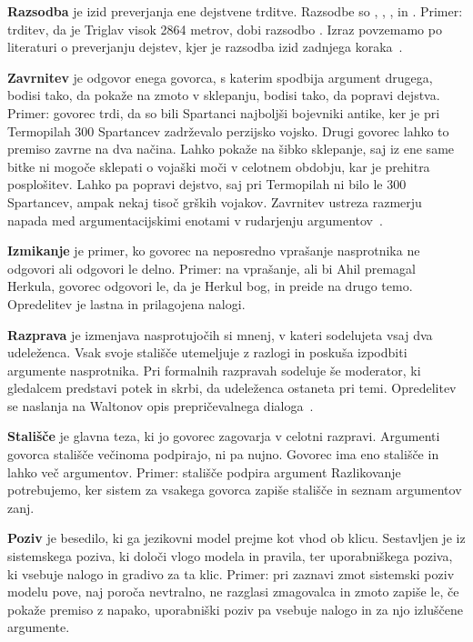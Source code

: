 \documentclass[a4paper, 12pt]{book}
\begin{document}
\textbf{Razsodba} je izid preverjanja ene dejstvene trditve. Razsodbe so , , ,  in . Primer: trditev, da je Triglav visok 2864 metrov, dobi razsodbo . Izraz povzemamo po literaturi o preverjanju dejstev, kjer je razsodba izid zadnjega koraka~\cite{guo2022survey}. 

\textbf{Zavrnitev} je odgovor enega govorca, s katerim spodbija argument drugega, bodisi tako, da pokaže na zmoto v sklepanju, bodisi tako, da popravi dejstva. Primer: govorec trdi, da so bili Spartanci najboljši bojevniki antike, ker je pri Termopilah 300 Spartancev zadrževalo perzijsko vojsko. Drugi govorec lahko to premiso zavrne na dva načina. Lahko pokaže na šibko sklepanje, saj iz ene same bitke ni mogoče sklepati o vojaški moči v celotnem obdobju, kar je prehitra posplošitev. Lahko pa popravi dejstvo, saj pri Termopilah ni bilo le 300 Spartancev, ampak nekaj tisoč grških vojakov. Zavrnitev ustreza razmerju napada med argumentacijskimi enotami v rudarjenju argumentov~\cite{stede2018}.

\textbf{Izmikanje} je primer, ko govorec na neposredno vprašanje nasprotnika ne odgovori ali odgovori le delno. Primer: na vprašanje, ali bi Ahil premagal Herkula, govorec odgovori le, da je Herkul bog, in preide na drugo temo. Opredelitev je lastna in prilagojena nalogi.

\textbf{Razprava} je izmenjava nasprotujočih si mnenj, v kateri sodelujeta vsaj dva udeleženca. Vsak svoje stališče utemeljuje z razlogi in poskuša izpodbiti argumente nasprotnika. Pri formalnih razpravah sodeluje še moderator, ki gledalcem predstavi potek in skrbi, da udeleženca ostaneta pri temi. Opredelitev se naslanja na Waltonov opis prepričevalnega dialoga~\cite{walton2008}. 

\textbf{Stališče} je glavna teza, ki jo govorec zagovarja v celotni razpravi. Argumenti govorca stališče večinoma podpirajo, ni pa nujno. Govorec ima eno stališče in lahko več argumentov. Primer: stališče  podpira argument  Razlikovanje potrebujemo, ker sistem za vsakega govorca zapiše stališče in seznam argumentov zanj.

\textbf{Poziv} je besedilo, ki ga jezikovni model prejme kot vhod ob klicu. Sestavljen je iz sistemskega poziva, ki določi vlogo modela in pravila, ter uporabniškega poziva, ki vsebuje nalogo in gradivo za ta klic. Primer: pri zaznavi zmot sistemski poziv modelu pove, naj poroča nevtralno, ne razglasi zmagovalca in zmoto zapiše le, če pokaže premiso z napako, uporabniški poziv pa vsebuje nalogo  in za njo izluščene argumente. 
\end{document}
